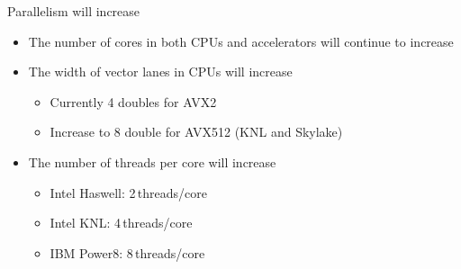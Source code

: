 \documentclass[aspectratio=169,12pt]{beamer}
\begin{document}
\begin{frame}{Parallelism will increase}
  \begin{itemize}
  \item The number of cores in both CPUs and accelerators will continue to increase
  \item The width of vector lanes in CPUs will increase
    \begin{itemize}
    \item Currently 4 doubles for AVX2
    \item Increase to 8 double for AVX512 (KNL and Skylake)
    \end{itemize}
  \item The number of threads per core will increase
    \begin{itemize}
    \item Intel Haswell: 2\,threads/core
    \item Intel KNL: 4\,threads/core
    \item IBM Power8: 8\,threads/core
    \end{itemize}
  \end{itemize}
\end{frame}
\end{document}
